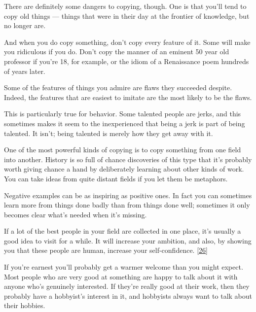 There
                  are definitely some dangers to copying, though. One is that
                  you'll tend to copy old things --- things that were in
                  their day at the frontier of knowledge, but no longer are.

And
                  when you do copy something, don't copy every feature of it.
                  Some will make you ridiculous if you do. Don't copy the manner
                  of an eminent 50 year old professor if you're 18, for example,
                  or the idiom of a Renaissance poem hundreds of years later.

Some
                  of the features of things you admire are flaws they succeeded
                  despite. Indeed, the features that are easiest to imitate are
                  the most likely to be the flaws.

This is
                  particularly true for behavior. Some talented people are
                  jerks, and this sometimes makes it seem to the inexperienced
                  that being a jerk is part of being talented. It isn't; being
                  talented is merely how they get away with it.

One
                  of the most powerful kinds of copying is to copy something
                  from one field into another. History is so full of chance
                  discoveries of this type that it's probably worth giving
                  chance a hand by deliberately learning about other kinds of
                  work. You can take ideas from quite distant fields if you let
                  them be metaphors.

Negative examples can be as
                  inspiring as positive ones. In fact you can sometimes learn
                  more from things done badly than from things done well;
                  sometimes it only becomes clear what's needed when it's
                  missing.






                  If a lot of the best people in your field are collected in one
                  place, it's usually a good idea to visit for a while. It will
                  increase your ambition, and also, by showing you that these
                  people are human, increase your self-confidence.
                  [\href{\#f26n}{26}]

If you're earnest you'll probably get a warmer
                  welcome than you might expect. Most people who are very good
                  at something are happy to talk about it with anyone who's
                  genuinely interested. If they're really good at their work,
                  then they probably have a hobbyist's interest in it, and
                  hobbyists always want to talk about their hobbies.

